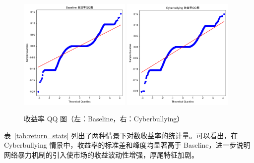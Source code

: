 \begin{figure}[htbp]
    \centering
    \includegraphics[width=0.48\textwidth]{image/fig4_3_return_qq_baseline.png}
    \hfill
    \includegraphics[width=0.48\textwidth]{image/fig4_3_return_qq_cyberbullying.png}
    \caption{收益率 QQ 图（左：Baseline，右：Cyberbullying）}
    \label{fig:return_qq}
\end{figure}

表~\ref{tab:return_stats} 列出了两种情景下对数收益率的统计量。可以看出，在 Cyberbullying 情景中，收益率的标准差和峰度均显著高于 Baseline，进一步说明网络暴力机制的引入使市场的收益波动性增强，厚尾特征加剧。

